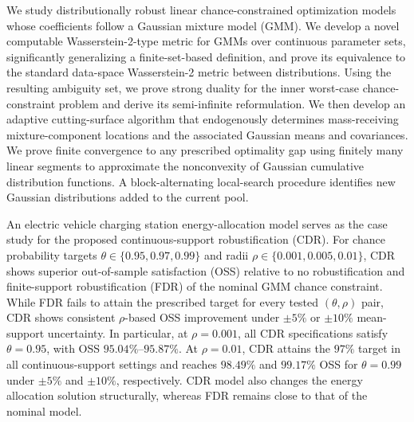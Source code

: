 \documentclass[opre,sglanonrev]{informs4}
\begin{document}
{We study distributionally robust linear chance-constrained optimization models whose coefficients follow a Gaussian mixture model (GMM). We develop a novel computable Wasserstein-2-type metric for GMMs over continuous parameter sets, significantly generalizing a finite-set-based definition, and prove its equivalence to the standard data-space Wasserstein-2 metric between distributions. Using the resulting ambiguity set, we prove strong duality for the inner worst-case chance-constraint problem and derive its semi-infinite reformulation. We then develop an adaptive cutting-surface algorithm that endogenously determines mass-receiving mixture-component locations and the associated Gaussian means and covariances. We prove finite convergence to any prescribed optimality gap using finitely many linear segments to approximate the nonconvexity of Gaussian cumulative distribution functions. A block-alternating local-search procedure identifies new Gaussian distributions added to the current pool.

An electric vehicle charging station energy-allocation model serves as the case study for the proposed continuous-support robustification (CDR). For chance probability targets \(\theta\in\{0.95,0.97,0.99\}\) and radii \(\rho\in\{0.001,0.005,0.01\}\), CDR shows superior out-of-sample satisfaction (OSS) relative to no robustification and finite-support robustification (FDR) of the nominal GMM chance constraint.
While FDR fails to attain the prescribed target for every tested \((\theta, \rho) \) pair, CDR shows consistent \(\rho\)-based OSS improvement under \(\pm5\%\) or \(\pm10\%\) mean-support uncertainty. In particular, at \(\rho=0.001\), all CDR specifications satisfy \(\theta=0.95\), with OSS \(95.04\%\)--\(95.87\%\). At \(\rho=0.01\), CDR attains the \(97\%\) target in all continuous-support settings and reaches \(98.49\%\) and \(99.17\%\) OSS for \(\theta=0.99\) under \(\pm5\%\) and \(\pm10\%\), respectively. CDR model also changes the energy allocation solution structurally, whereas FDR remains close to that of the nominal model.
}
\maketitle
\end{document}
